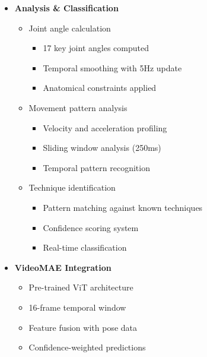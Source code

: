 \documentclass[landscape]{article}
\begin{document}
\begin{itemize}
    \item \textbf{Analysis \& Classification}
    \begin{itemize}
        \item Joint angle calculation
        \begin{itemize}
            \item 17 key joint angles computed
            \item Temporal smoothing with 5Hz update
            \item Anatomical constraints applied
        \end{itemize}
        \item Movement pattern analysis
        \begin{itemize}
            \item Velocity and acceleration profiling
            \item Sliding window analysis (250ms)
            \item Temporal pattern recognition
        \end{itemize}
        \item Technique identification
        \begin{itemize}
            \item Pattern matching against known techniques
            \item Confidence scoring system
            \item Real-time classification
        \end{itemize}
    \end{itemize}
    
    \item \textbf{VideoMAE Integration}
    \begin{itemize}
        \item Pre-trained ViT architecture
        \item 16-frame temporal window
        \item Feature fusion with pose data
        \item Confidence-weighted predictions
    \end{itemize}
\end{itemize}
\end{document}
